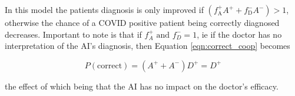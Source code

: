 \documentclass[manuscript,screen,review]{acmart}
\begin{document}
In this model the patients diagnosis is only improved if $(f^+_{\textrm{A}}A^+ + f^-_{\textrm{D}}A^-) > 1$, otherwise the chance of a COVID positive patient being correctly diagnosed decreases. Important to note is that if $f^+_A \textrm{ and } f^-_D = 1$, ie if the doctor has no interpretation of the AI's diagnosis, then Equation \ref{eqn:correct_coop} becomes

\begin{equation}
    P(\textrm{correct}) = (A^+ + A^-) D^+ = D^+
\end{equation}

the effect of which being that the AI has no impact on the doctor's efficacy. 










\end{document}
